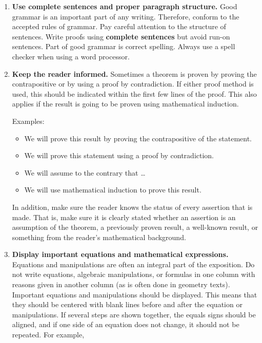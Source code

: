 \begin{enumerate}
\item \textbf{Use complete sentences and proper paragraph structure.}
Good grammar is an important part of any writing.  Therefore, conform to the accepted rules of grammar.  Pay careful attention to the structure of sentences.  Write proofs using \textbf{complete sentences} but avoid run-on sentences.  Part of good grammar is correct spelling.  Always use a spell checker when using a word processor.

\item \textbf{Keep the reader informed.}
Sometimes a theorem is proven by proving the contrapositive or by using a proof by contradiction.  If either proof method is used, this should be indicated within the first few lines of the proof.  This also applies if the result is going to be proven using mathematical induction.

Examples:
\begin{itemize}
\item We will prove this result by proving the contrapositive of the statement.


\item We will prove this statement using a proof by contradiction.

\item We will assume to the contrary that \ldots

\item We will use mathematical induction to prove this result.
\end{itemize}

In addition, make sure the reader knows the status of every assertion that is made.  That is, make sure it is clearly stated whether an assertion is an assumption of the theorem, a previously proven result, a well-known result, or something from the reader's mathematical background.

\item \textbf{Display important equations and mathematical expressions.}
Equations and manipulations are often an integral part of the exposition.  Do not write equations, algebraic manipulations, or formulas in one column with reasons given in another column (as is often done in geometry texts).   Important equations and manipulations should be displayed.  This means that they should be centered with blank lines before and after the equation or manipulations.  If several steps are shown together, the equals signs should be aligned, and if one side of an equation does not change, it should not be repeated.  For example,


\end{enumerate}

